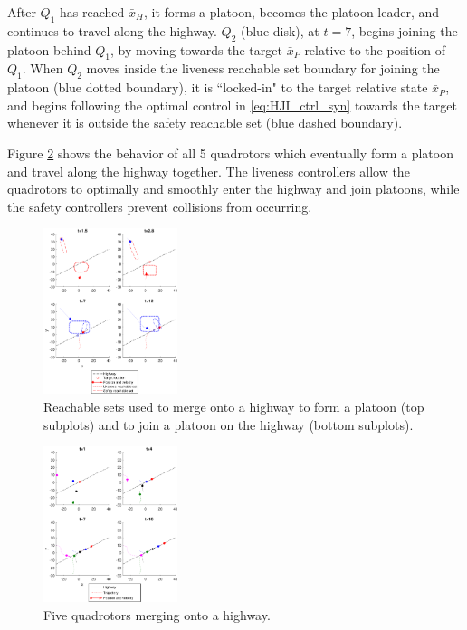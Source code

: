 After $Q_1$ has reached $\bar{x}_H$, it forms a platoon, becomes the platoon leader, and continues to travel along the highway. $Q_2$ (blue disk), at $t=7$, begins joining the platoon behind $Q_1$, by moving towards the target $\bar{x}_P$ relative to the position of $Q_1$. When $Q_2$ moves inside the liveness reachable set boundary for joining the platoon (blue dotted boundary), it is ``locked-in" to the target relative state $\bar{x}_P$, and begins following the optimal control in \eqref{eq:HJI_ctrl_syn} towards the target whenever it is outside the safety reachable set (blue dashed boundary).

Figure \ref{fig:normal5} shows the behavior of all 5 quadrotors which eventually form a platoon and travel along the highway together. The liveness controllers allow the quadrotors to optimally and smoothly enter the highway and join platoons, while the safety controllers prevent collisions from occurring.

\begin{figure}
	\centering
	\includegraphics[width=0.35\textwidth]{fig/normal2}
	\caption{Reachable sets used to merge onto a highway to form a platoon (top subplots) and to join a platoon on the highway (bottom subplots).}
	\label{fig:normal2}
\end{figure}

\begin{figure}
	\centering
	\includegraphics[width=0.35\textwidth]{fig/normal5}
	\caption{Five quadrotors merging onto a highway.}
	\label{fig:normal5}
\end{figure}

